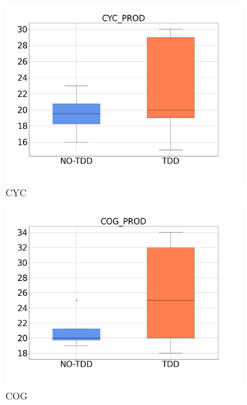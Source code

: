 \begin{figure}[htbp]
    \medskip
    \begin{subfigure}{0.33\textwidth}
        \includegraphics[width=\linewidth]{figures/box_plots/task3/CYC.png}
        \caption{CYC}
        \label{bp_task3_cyc}
    \end{subfigure}\hfil
    \begin{subfigure}{0.33\textwidth}
        \includegraphics[width=\linewidth]{figures/box_plots/task3/COG.png}
        \caption{COG}
        \label{bp_task3_cog}
    \end{subfigure}\hfil
    \begin{subfigure}{0.33\textwidth}

\end{subfigure}
\end{figure}
